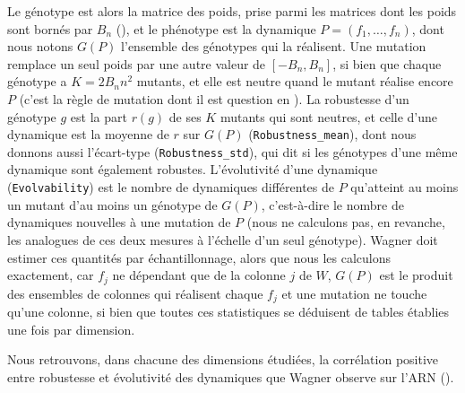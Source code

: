 \documentclass[12pt, a4paper]{article}
\begin{document}
Le génotype est alors la matrice des poids, prise parmi les matrices dont les poids sont bornés par $B_n$ (), et le phénotype est la dynamique $P = (f_1, \dots, f_n)$, dont nous notons $G(P)$ l'ensemble des génotypes qui la réalisent.
Une mutation remplace un seul poids par une autre valeur de $[-B_n, B_n]$, si bien que chaque génotype a $K = 2B_n n^2$ mutants, et elle est neutre quand le mutant réalise encore $P$ (c'est la règle de mutation dont il est question en ).
La robustesse d'un génotype $g$ est la part $r(g)$ de ses $K$ mutants qui sont neutres, et celle d'une dynamique est la moyenne de $r$ sur $G(P)$ (\texttt{Robustness\_mean}), dont nous donnons aussi l'écart-type (\texttt{Robustness\_std}), qui dit si les génotypes d'une même dynamique sont également robustes.
L'évolutivité d'une dynamique (\texttt{Evolvability}) est le nombre de dynamiques différentes de $P$ qu'atteint au moins un mutant d'au moins un génotype de $G(P)$, c'est-à-dire le nombre de dynamiques nouvelles à une mutation de $P$ (nous ne calculons pas, en revanche, les analogues de ces deux mesures à l'échelle d'un seul génotype).
Wagner doit estimer ces quantités par échantillonnage, alors que nous les calculons exactement, car $f_j$ ne dépendant que de la colonne $j$ de $W$, $G(P)$ est le produit des ensembles de colonnes qui réalisent chaque $f_j$ et une mutation ne touche qu'une colonne, si bien que toutes ces statistiques se déduisent de tables établies une fois par dimension.

Nous retrouvons, dans chacune des dimensions étudiées, la corrélation positive entre robustesse et évolutivité des dynamiques que Wagner observe sur l'ARN ().
\end{document}
